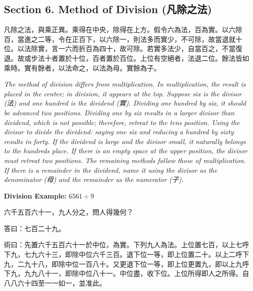 \documentclass[11pt,a4paper]{article}
\newcommand{\zh}[1]{{\CJKfamily{}#1}}
\begin{document}
\subsection*{Section 6. Method of Division (\zh{凡除之法})}

\begin{problembox}[title=\zh{凡除之法}]
\zh{凡除之法，與乘正異。乘得在中央，除得在上方。假令六為法，百為實。以六除百，當進之二等，令在正百下，以六除一，則法多而實少，不可除，故當退就十位。以法除實，言一六而折百為四十，故可除。若實多法少，自當百之，不當復退。故或步法十者置於十位，百者置於百位。上位有空絕者，法退二位。餘法皆如乘時。實有餘者，以法命之，以法為母。實餘為子。}
\end{problembox}

\textit{The method of division differs from multiplication. In multiplication, the result is placed in the center; in division, it appears at the top. Suppose six is the divisor (\zh{法}) and one hundred is the dividend (\zh{實}). Dividing one hundred by six, it should be advanced two positions. Dividing one by six results in a larger divisor than dividend, which is not possible; therefore, retreat to the tens position. Using the divisor to divide the dividend: saying one six and reducing a hundred by sixty results in forty. If the dividend is large and the divisor small, it naturally belongs to the hundreds place. If there is an empty space at the upper position, the divisor must retreat two positions. The remaining methods follow those of multiplication. If there is a remainder in the dividend, name it using the divisor as the denominator (\zh{母}) and the remainder as the numerator (\zh{子}).}

\vspace{0.3cm}

\textbf{Division Example:} $6561 \div 9$

\begin{problembox}[title=\zh{問}]
\zh{六千五百六十一，九人分之，問人得幾何？}
\end{problembox}
\begin{answerbox}[title=\zh{答}]
\zh{答曰：七百二十九。}
\end{answerbox}
\begin{methodbox}[title=\zh{術}]
\zh{術曰：先置六千五百六十一於中位，為實。下列九人為法。上位置七百，以上七呼下九，七九六十三，即除中位六千三百。退下位一等，即上位置二十。以上二呼下九，二九十八，即除中位一百八十。又更退下位一等，即上位更置九，即以上九呼下九，九九八十一，即除中位八十一。中位盡，收下位。上位所得即人之所得。自八八六十四至一一如一，並准此。}
\end{methodbox}
\end{document}
